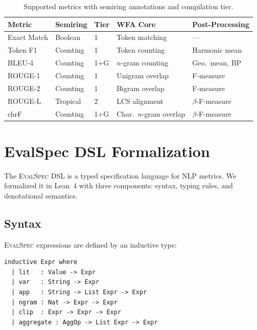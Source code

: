 \documentclass[11pt]{article}
\newcommand{\evalspec}{\textsc{EvalSpec}}
\begin{document}
\begin{table}[t]
\centering
\caption{Supported metrics with semiring annotations and compilation tier.}
\label{tab:metrics}
\smallskip
\begin{tabular}{@{}lllll@{}}
\toprule
\textbf{Metric} & \textbf{Semiring} & \textbf{Tier} &
  \textbf{WFA Core} & \textbf{Post-Processing} \\
\midrule
Exact Match  & Boolean   & 1     & Token matching & --- \\
Token F1     & Counting  & 1     & Token counting & Harmonic mean \\
BLEU-4       & Counting  & 1+G   & $n$-gram counting & Geo.\ mean, BP \\
ROUGE-1      & Counting  & 1     & Unigram overlap & F-measure \\
ROUGE-2      & Counting  & 1     & Bigram overlap & F-measure \\
ROUGE-L      & Tropical  & 2     & LCS alignment & $\beta$-F-measure \\
chrF         & Counting  & 1+G   & Char.\ $n$-gram overlap & $\beta$-F-measure \\
\bottomrule
\end{tabular}
\end{table}



\section{EvalSpec DSL Formalization}\label{sec:evalspec}

The \evalspec{} DSL is a typed specification language for NLP metrics.
We formalized it in Lean~4 with three components: syntax, typing rules,
and denotational semantics.

\subsection{Syntax}

\evalspec{} expressions are defined by an inductive type:

\begin{lstlisting}[language=Lean4,caption={\evalspec{} syntax (simplified).}]
inductive Expr where
  | lit   : Value -> Expr
  | var   : String -> Expr
  | app   : String -> List Expr -> Expr
  | ngram : Nat -> Expr -> Expr
  | clip  : Expr -> Expr -> Expr
  | aggregate : AggOp -> List Expr -> Expr
\end{lstlisting}
\end{document}
